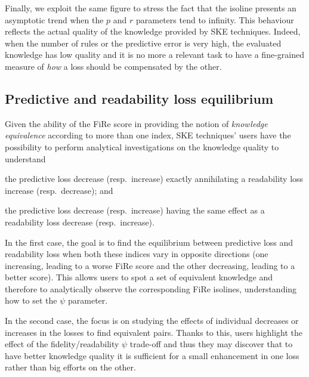 \documentclass{article}
\newcommand{\fire}{FiRe}
\newenvironment{inlinelist}{\begin{enumerate*}[label=\emph{(\roman{*})}]}{\end{enumerate*}}
\begin{document}
Finally, we exploit the same figure to stress the fact that the isoline presents an asymptotic trend when the $p$ and $r$ parameters tend to infinity.
%
This behaviour reflects the actual quality of the knowledge provided by SKE techniques.
%
Indeed, when the number of rules or the predictive error is very high, the evaluated knowledge has low quality and it is no more a relevant task to have a fine-grained measure of \emph{how} a loss should be compensated by the other.

\subsection{Predictive and readability loss equilibrium}\label{ssec:balance}

Given the ability of the \fire{} score in providing the notion of \emph{knowledge equivalence} according to more than one index, SKE techniques' users have the possibility to perform analytical investigations on the knowledge quality to understand
%
\begin{inlinelist}
	\item the predictive loss decrease (resp.\ increase) exactly annihilating a readability loss increase (resp.\ decrease); and
	\item the predictive loss decrease (resp.\ increase) having the same effect as a readability loss decrease (resp.\ increase).
\end{inlinelist}

In the first case, the goal is to find the equilibrium between predictive loss and readability loss when both these indices vary in opposite directions (one increasing, leading to a worse \fire{} score and the other decreasing, leading to a better score).
%
This allows users to spot a set of equivalent knowledge and therefore to analytically observe the corresponding \fire{} isolines, understanding how to set the $\psi$ parameter.

In the second case, the focus is on studying the effects of individual decreases or increases in the losses to find equivalent pairs.
%
Thanks to this, users highlight the effect of the fidelity/readability $\psi$ trade-off and thus they may discover that to have better knowledge quality it is sufficient for a small enhancement in one loss rather than big efforts on the other.
\end{document}
